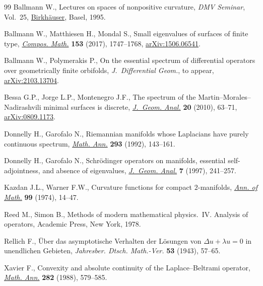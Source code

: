 \documentclass[11pt]{article}
\numberwithin{equation}{section}
\numberwithin{equation}{section}
\begin{document}
\begin{thebibliography}{99}
Ballmann W., Lectures on spaces of nonpositive curvature, \textit{DMV Seminar},
 Vol.~25, \href{https://doi.org/10.1007/978-3-0348-9240-7}{{Birkh\"auser}}, Basel, 1995.

Ballmann W., Matthiesen H., Mondal S., Small eigenvalues of surfaces of finite
 type, \href{https://doi.org/10.1112/S0010437X17007291}{\textit{Compos. Math.}} \textbf{153} (2017), 1747--1768,
 \href{https://arxiv.org/abs/1506.06541}{arXiv:1506.06541}.

Ballmann W., Polymerakis P., On the essential spectrum of differential
 operators over geometrically finite orbifolds, \textit{J.~Differential Geom.},
 {t}o appear, \href{https://arxiv.org/abs/2103.13704}{arXiv:2103.13704}.

Bessa G.P., Jorge L.P., Montenegro J.F., The spectrum of the
 {M}artin--{M}orales--{N}adirashvili minimal surfaces is discrete,
 \href{https://doi.org/10.1007/s12220-009-9101-z}{\textit{J.~Geom. Anal.}} \textbf{20} (2010), 63--71, \href{https://arxiv.org/abs/0809.1173}{arXiv:0809.1173}.

Donnelly H., Garofalo N., Riemannian manifolds whose {L}aplacians have purely
 continuous spectrum, \href{https://doi.org/10.1007/BF01444709}{\textit{Math. Ann.}} \textbf{293} (1992), 143--161.

Donnelly H., Garofalo N., Schr\"odinger operators on manifolds, essential
 self-adjointness, and absence of eigenvalues, \href{https://doi.org/10.1007/BF02921722}{\textit{J.~Geom. Anal.}}
 \textbf{7} (1997), 241--257.

Kazdan J.L., Warner F.W., Curvature functions for compact {$2$}-manifolds,
 \href{https://doi.org/10.2307/1971012}{\textit{Ann. of Math.}} \textbf{99} (1974), 14--47.

Reed M., Simon B., Methods of modern mathematical physics.~{IV}. {A}nalysis of
 operators, Academic Press, New York, 1978.

Rellich F., \"{U}ber das asymptotische {V}erhalten der {L}\"osungen von
 {$\Delta u+\lambda u=0$} in unendlichen {G}ebieten, \textit{Jahresber. Dtsch.
 Math.-Ver.} \textbf{53} (1943), 57--65.

Xavier F., Convexity and absolute continuity of the {L}aplace--{B}eltrami
 operator, \href{https://doi.org/10.1007/BF01462884}{\textit{Math. Ann.}} \textbf{282} (1988), 579--585.

\end{thebibliography}
\end{document}

